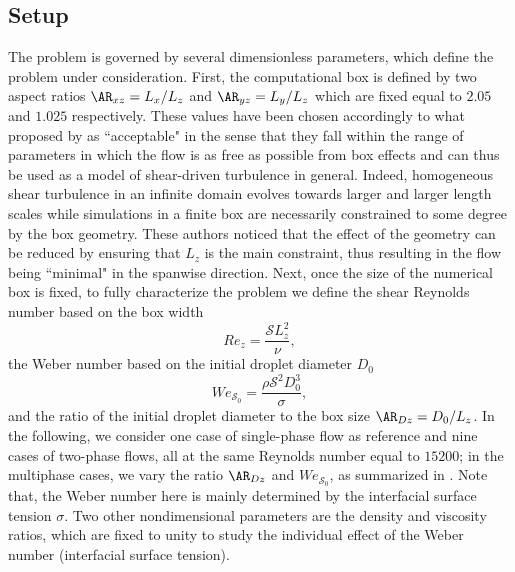 \subsection{Setup}
The problem is governed by several dimensionless parameters, which define the problem under consideration. First, the computational box is defined by two aspect ratios $\AR_{xz} = L_x/L_z$ and $\AR_{yz} = L_y/L_z$ which are fixed equal to $2.05$ and $1.025$ respectively. These values have been chosen accordingly to what proposed by \cite{sekimoto_dong_jimenez_2016a} as ``acceptable" in the sense that they fall within the range of parameters in which the flow is as free as possible from box effects and can thus be used as a model of shear-driven turbulence in general. Indeed, homogeneous shear turbulence in an infinite domain evolves towards larger and larger length scales while simulations in a finite box are necessarily constrained to some degree by the box geometry. These authors noticed that the effect of the geometry can be reduced by ensuring that $L_z$ is the main constraint, thus resulting in the flow being ``minimal" in the spanwise direction. Next, once the size of the numerical box is fixed, to fully characterize the problem we define the shear Reynolds number based on the box width
\begin{equation}
Re_z = \frac{\mathcal{S} L_z^2}{\nu},
\end{equation}
the Weber number based on the initial droplet diameter $D_0$
\begin{equation}
\label{eq:wes}
We_{\mathcal{S}_0} = \frac{\rho \mathcal{S}^2 D_0^3}{\sigma},
\end{equation}
and the ratio of the initial droplet diameter to the box size $\AR_{Dz}=D_0/L_z$. In the following, we consider one case of single-phase flow as reference and nine cases of two-phase flows, all at the same Reynolds number equal to $15200$; in the multiphase cases, we vary the ratio $\AR_{Dz}$ and $We_{\mathcal{S}_0}$, as summarized in . Note that, the Weber number here is mainly determined by the interfacial surface tension $\sigma$. Two other nondimensional parameters are the density and viscosity ratios, which are fixed to unity to study the individual effect of the Weber number (interfacial surface tension).


